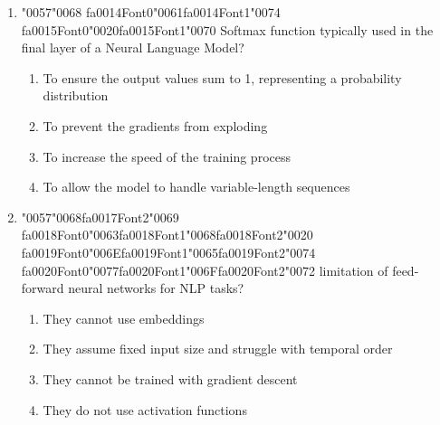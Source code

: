 \documentclass[12pt]{article}
\begin{document}
\begin{enumerate}[label=Q\arabic*.]
\begin{enumerate}[label=(\Alph*)]
    \item To store the final output of the entire sequence.
    \item To act as a memory that carries information from previous time steps
    \item To calculate the loss function for the current word
    \item To normalize the input embeddings
\end{enumerate}
\item {\char"0057}{\char"0068} {\csname fa0014Font0\endcsname\char"0061}{\csname fa0014Font1\endcsname\char"0074} {\csname fa0015Font0\endcsname\char"0020}{\csname fa0015Font1\endcsname\char"0070} Softmax function typically used in the final layer of a Neural Language Model?
\begin{enumerate}[label=(\Alph*)]
    \item To ensure the output values sum to 1, representing a probability distribution
    \item To prevent the gradients from exploding
    \item To increase the speed of the training process
    \item To allow the model to handle variable-length sequences
\end{enumerate}
\item {\char"0057}{\char"0068}{\csname fa0017Font2\endcsname\char"0069} {\csname fa0018Font0\endcsname\char"0063}{\csname fa0018Font1\endcsname\char"0068}{\csname fa0018Font2\endcsname\char"0020} {\csname fa0019Font0\endcsname\char"006E}{\csname fa0019Font1\endcsname\char"0065}{\csname fa0019Font2\endcsname\char"0074} {\csname fa0020Font0\endcsname\char"0077}{\csname fa0020Font1\endcsname\char"006F}{\csname fa0020Font2\endcsname\char"0072} limitation of feed-forward neural networks for NLP tasks?
\begin{enumerate}[label=(\Alph*)]
    \item They cannot use embeddings
    \item They assume fixed input size and struggle with temporal order
    \item They cannot be trained with gradient descent
    \item They do not use activation functions
\end{enumerate}

\end{enumerate}
\end{document}
